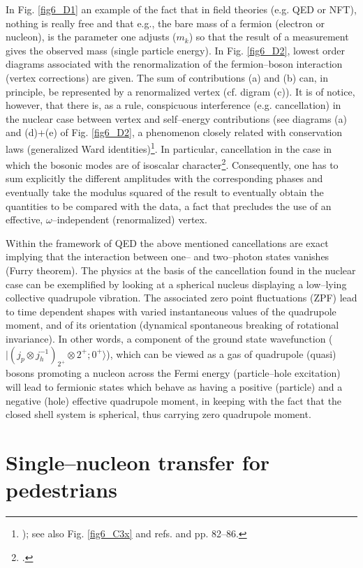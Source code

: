 \begin{subappendices}
In Fig. \ref{fig6_D1} an example of the fact that in field theories (e.g. QED or NFT), nothing is really free and that e.g., the bare mass of a fermion (electron or nucleon), is the parameter one adjusts ($m_k$) so that the result of a measurement  gives the observed mass (single particle energy). In Fig. \ref{fig6_D2}, lowest order diagrams associated with the renormalization of the fermion--boson interaction (vertex corrections) are given. The sum of contributions (a) and (b) can, in principle, be represented by a renormalized vertex (cf. digram (c)). It is of notice, however, that there is, as a rule, conspicuous interference (e.g. cancellation) in the nuclear case between vertex and self--energy contributions (see diagrams (a) and (d)+(e) of Fig. \ref{fig6_D2}, a phenomenon closely related with conservation laws (generalized Ward identities)\footnote{ \cite{Schrieffer:64}); see also Fig. \ref{fig6_C3x} and refs. \cite{Bortignon:81,Bertsch:83} and \cite{Bortignon:98} pp. 82--86.}. In particular, cancellation in the case in which the bosonic modes are of isoscalar character\footnote{\cite{Bortignon:83}.}. Consequently, one has to sum explicitly the different amplitudes with the corresponding phases and eventually take the modulus squared of the result to eventually obtain the quantities to be compared with the data, a fact that precludes the use of an effective, $\omega$--independent (renormalized) vertex.

Within the framework of QED the above mentioned cancellations are exact implying that the interaction between one-- and two--photon states vanishes (Furry theorem). The physics at the basis of the cancellation found in the nuclear case can be exemplified by looking at a spherical nucleus displaying a low--lying collective quadrupole vibration. The associated zero point fluctuations (ZPF) lead to time dependent shapes with varied instantaneous values of the quadrupole moment,  and of its orientation (dynamical spontaneous breaking of rotational invariance). In other words, a component of the ground state wavefunction ($|(j_p \otimes j_h^{-1})_{2^+} \otimes 2^+; 0^+\rangle $), which can be viewed as a  gas of quadrupole (quasi) bosons promoting a nucleon across the Fermi energy (particle--hole excitation) will lead to fermionic states which behave as having a positive (particle) and a negative (hole) effective quadrupole moment, in keeping with the fact that the closed shell system is spherical, thus carrying zero quadrupole moment. 

\section{Single--nucleon transfer for pedestrians}\label{C6AppE}


\end{subappendices}
